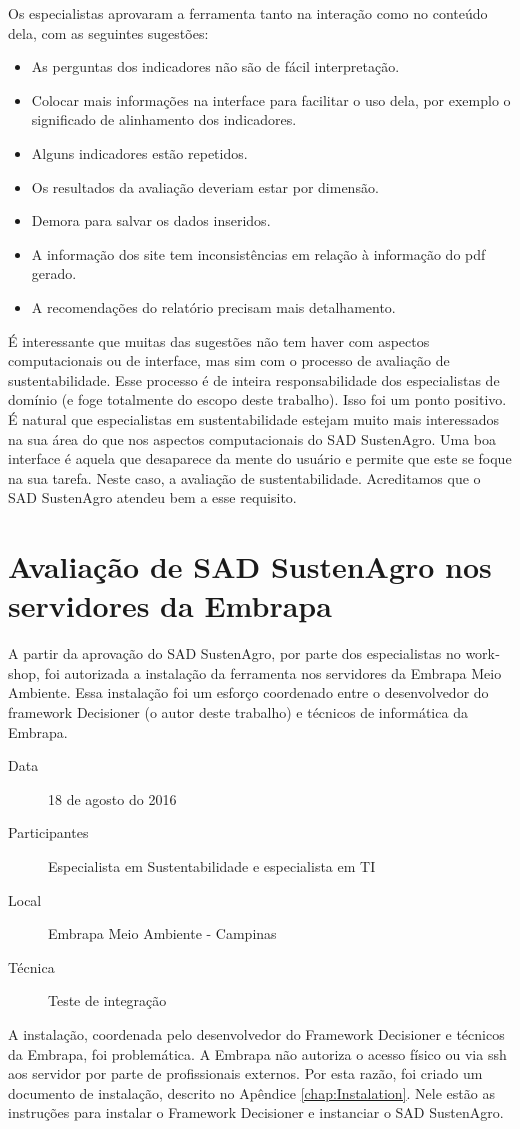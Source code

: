 Os especialistas aprovaram a ferramenta tanto na interação como no
conteúdo dela, com as seguintes sugestões:
\begin{itemize}
\item As perguntas dos indicadores não são de fácil interpretação.
\item Colocar mais informações na interface para facilitar o uso dela, por
exemplo o significado de alinhamento dos indicadores.
\item Alguns indicadores estão repetidos.
\item Os resultados da avaliação deveriam estar por dimensão.
\item Demora para salvar os dados inseridos.
\item A informação dos site tem inconsistências em relação à informação
do pdf gerado.
\item A recomendações do relatório precisam mais detalhamento.
\end{itemize}
É interessante que muitas das sugestões não tem haver com aspectos
computacionais ou de interface, mas sim com o processo de avaliação
de sustentabilidade. Esse processo é de inteira responsabilidade dos
especialistas de domínio (e foge totalmente do escopo deste trabalho).
Isso foi um ponto positivo. É natural que especialistas em sustentabilidade
estejam muito mais interessados na sua área do que nos aspectos computacionais
do SAD SustenAgro. Uma boa interface é aquela que desaparece da mente
do usuário e permite que este se foque na sua tarefa. Neste caso,
a avaliação de sustentabilidade. Acreditamos que o SAD SustenAgro
atendeu bem a esse requisito.

\section{Avaliação de SAD SustenAgro nos servidores da Embrapa}

A partir da aprovação do SAD SustenAgro, por parte dos especialistas
no \foreignlanguage{english}{workshop}, foi autorizada a instalação
da ferramenta nos servidores da Embrapa Meio Ambiente. Essa instalação
foi um esforço coordenado entre o desenvolvedor do framework Decisioner
(o autor deste trabalho) e técnicos de informática da Embrapa.
\begin{description}
\item [{Data}] 18 de agosto do 2016
\item [{Participantes}] Especialista em Sustentabilidade e especialista
em TI
\item [{Local}] Embrapa Meio Ambiente - Campinas
\item [{Técnica}] Teste de integração
\end{description}
A instalação, coordenada pelo desenvolvedor do Framework Decisioner
e técnicos da Embrapa, foi problemática. A Embrapa não autoriza o
acesso físico ou via ssh aos servidor por parte de profissionais externos.
Por esta razão, foi criado um documento de instalação, descrito no
Apêndice \ref{chap:Instalation}. Nele estão as instruções para instalar
o Framework Decisioner e instanciar o SAD SustenAgro.

